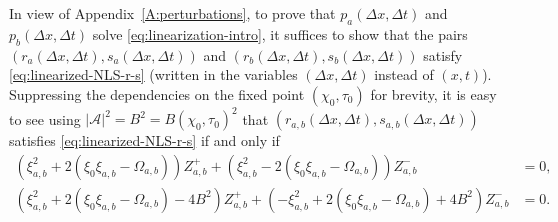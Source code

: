 In view of Appendix~\ref{A:perturbations}, to prove that $p_a(\Delta x, \Delta t)$ and $p_b(\Delta x,\Delta t)$ solve \eqref{eq:linearization-intro},
it suffices to show that the pairs $(r_{a}(\Delta x, \Delta t), s_{a}(\Delta x, \Delta t))$ and $(r_{b}(\Delta x, \Delta t), s_{b}(\Delta x, \Delta t))$ satisfy \eqref{eq:linearized-NLS-r-s} (written in the variables $(\Delta x,\Delta t)$ instead of $(x,t)$). Suppressing the dependencies on the fixed point $(\chi_0,\tau_0)$ for brevity, it is easy to see using $|\mathcal{A}|^2=B^2=B(\chi_0,\tau_0)^2$ that $(r_{a,b}(\Delta x, \Delta t), s_{a,b}(\Delta x, \Delta t))$ satisfies \eqref{eq:linearized-NLS-r-s} if and only if 
\begin{align}
\left( \xi_{a,b}^2 + 2(\xi_0 \xi_{a,b} - \Omega_{a,b}) \right)Z_{a,b}^+ +\left( \xi_{a,b}^2 - 2(\xi_0 \xi_{a,b} - \Omega_{a,b}) \right) Z_{a,b}^- &= 0,\label{eq:F-a-b-pm-sys-1}\\%
\left( \xi_{a,b}^2 + 2(\xi_0 \xi_{a,b} - \Omega_{a,b})  - 4 B^2 \right) Z_{a,b}^+ +\left( - \xi_{a,b}^2 + 2(\xi_0 \xi_{a,b} - \Omega_{a,b})  + 4 B^2 \right)Z_{a,b}^- &= 0.\label{eq:F-a-b-pm-sys-2}%
\end{align}
